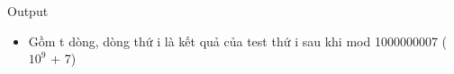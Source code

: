 Output
\begin{itemize}
	\item     Gồm t dòng, dòng thứ i là kết quả của test thứ i sau khi mod 1000000007 ($10^{9}$    + 7)   
\end{itemize}